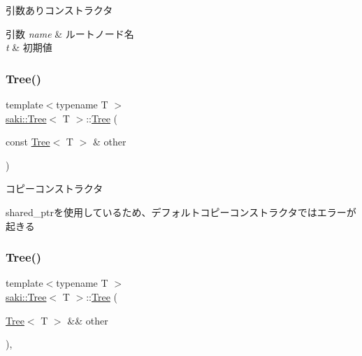 引数ありコンストラクタ 


\begin{DoxyParams}{引数}
{\em name} & ルートノード名 \\
\hline
{\em t} & 初期値 \\
\hline
\end{DoxyParams}
\mbox{\label{classsaki_1_1_tree_a3716d7484b92161bbb38c362280358c0}} 
\subsubsection{\texorpdfstring{Tree()}{Tree()}\hspace{0.1cm}{\footnotesize\ttfamily [2/3]}}
{\footnotesize\ttfamily template$<$typename T $>$ \\
\mbox{\hyperlink{classsaki_1_1_tree}{saki\+::\+Tree}}$<$ T $>$\+::\mbox{\hyperlink{classsaki_1_1_tree}{Tree}} (\begin{DoxyParamCaption}\item[{const \mbox{\hyperlink{classsaki_1_1_tree}{Tree}}$<$ T $>$ \&}]{other }\end{DoxyParamCaption})\hspace{0.3cm}{\ttfamily [inline]}}



コピーコンストラクタ 

shared\+\_\+ptrを使用しているため、デフォルトコピーコンストラクタではエラーが起きる \mbox{\label{classsaki_1_1_tree_ad26ec9d86d0ed3f360c88ea4342b726f}} 
\subsubsection{\texorpdfstring{Tree()}{Tree()}\hspace{0.1cm}{\footnotesize\ttfamily [3/3]}}
{\footnotesize\ttfamily template$<$typename T $>$ \\
\mbox{\hyperlink{classsaki_1_1_tree}{saki\+::\+Tree}}$<$ T $>$\+::\mbox{\hyperlink{classsaki_1_1_tree}{Tree}} (\begin{DoxyParamCaption}\item[{\mbox{\hyperlink{classsaki_1_1_tree}{Tree}}$<$ T $>$ \&\&}]{other }\end{DoxyParamCaption})\hspace{0.3cm}{\ttfamily [inline]}, {\ttfamily [noexcept]}}



